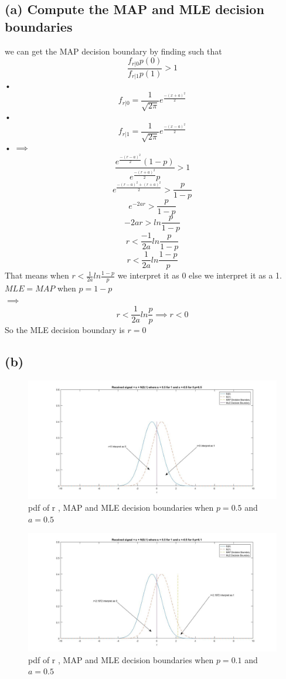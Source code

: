 \documentclass[a4paper,11pt]{article}
\begin{document}
\subsection*{(a) Compute the MAP and MLE decision boundaries}
we can get the MAP decision boundary by finding such that 
\begin{equation}
\frac{f_{r|0}p(0)}{f_{r|1}p(1)}>1
\end{equation}• 
\begin{equation}
f_{r|0} = \frac{1}{\sqrt{2\pi}}e^\frac{-(x+a)^2}{2}
\end{equation}•
\begin{equation}
f_{r|1} = \frac{1}{\sqrt{2\pi}}e^\frac{-(x-a)^2}{2}
\end{equation}•
$\implies$
$$\frac{e^\frac{-(r-a)^2}{2}(1-p)}{e^\frac{-(r+a)^2}{2}p}>1$$
$$e^\frac{-(r-a)^2+(r+a)^2}{2}>\frac{p}{1-p}$$
$$e^{-2ar}>\frac{p}{1-p}$$
$$-2ar>ln\frac{p}{1-p}$$
$$r<\frac{-1}{2a}ln\frac{p}{1-p}$$
$$r<\frac{1}{2a}ln\frac{1-p}{p}$$
That means when $r<\frac{1}{2a}ln\frac{1-p}{p}$ we interpret it as 0 else we interpret it  as a 1.\\
$MLE = MAP$ when $p = 1-p$\\
$\implies$
$$r<\frac{1}{2a}ln\frac{p}{p}\implies r<0$$
So the MLE decision boundary is $r=0$
\clearpage
\newpage
\subsection*{(b)}
\begin{figure}[h]
   \hspace*{-5.5cm}
    \includegraphics[scale=0.5]{q2_b_1}
    \caption{pdf of r , MAP and MLE decision boundaries when $p=0.5$ and $a=0.5$}\label{fig:q2_b_1}
\end{figure}
\begin{figure}[h]
   \hspace*{-5.5cm}
    \includegraphics[scale=0.5]{q2_b_2}
    \caption{pdf of r , MAP and MLE decision boundaries when $p=0.1$ and $a=0.5$}\label{fig:q2_b_2}
\end{figure}
\clearpage
\newpage
\end{document}
